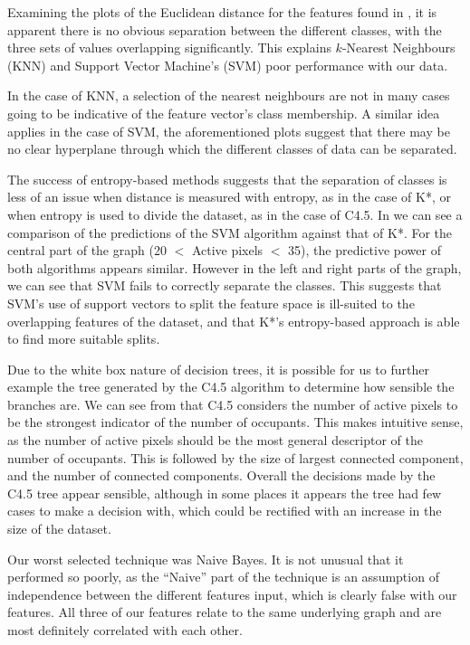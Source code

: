 \documentclass[../thesis/thesis.tex]{subfiles}
\begin{document}
Examining the plots of the Euclidean distance for the features found in , it is apparent there is no obvious separation between the different classes, with the three sets of values overlapping significantly. This explains $k$-Nearest Neighbours (KNN) and Support Vector Machine's (SVM) poor performance with our data.

In the case of KNN, a selection of the nearest neighbours are not in many cases going to be indicative of the feature vector's class membership. A similar idea applies in the case of SVM, the aforementioned plots suggest that there may be no clear hyperplane through which the different classes of data can be separated.

The success of entropy-based methods suggests that the separation of classes is less of an issue when distance is measured with entropy, as in the case of K*, or when entropy is used to divide the dataset, as in the case of C4.5. In  we can see a comparison of the predictions of the SVM algorithm against that of K*. For the central part of the graph (20 $<$ Active pixels $<$ 35), the predictive power of both algorithms appears similar. However in the left and right parts of the graph, we can see that SVM fails to correctly separate the classes. This suggests that SVM's use of support vectors to split the feature space is ill-suited to the overlapping features of the dataset, and that K*'s entropy-based approach is able to find more suitable splits.

Due to the white box nature of decision trees, it is possible for us to further example the tree generated by the C4.5 algorithm  to determine how sensible the branches are. We can see from  that C4.5 considers the number of active pixels to be the strongest indicator of the number of occupants. This makes intuitive sense, as the number of active pixels should be the most general descriptor of the number of occupants. This is followed by the size of largest connected component, and the number of connected components. Overall the decisions made by the C4.5 tree appear sensible, although in some places it appears the tree had few cases to make a decision with, which could be rectified with an increase in the size of the dataset.

Our worst selected technique was Naive Bayes. It is not unusual that it performed so poorly, as the ``Naive'' part of the technique is an assumption of independence between the different features input, which is clearly false with our features. All three of our features relate to the same underlying graph and are most definitely correlated with each other.
\end{document}

